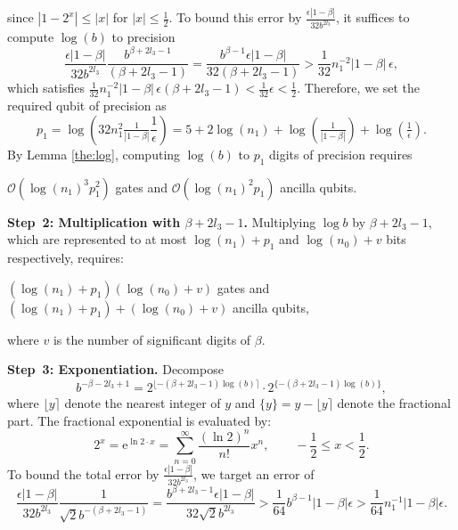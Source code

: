\documentclass[aps,pra,twocolumn,superscriptaddress,preprintnumbers,amsmath,amssymb]{revtex4-2}
\begin{document}
since \( |1 - 2^x| \leq |x| \) for \( |x| \leq\frac{1}{2}\). To bound this error by $\frac{\epsilon|1-\beta|}{32b^{2l_3}}$,
it suffices to compute $\log(b)$ to precision
\begin{equation}
\frac{\epsilon|1-\beta|}{32b^{2l_3}}\frac{b^{\beta+2l_3-1}}{(\beta+2l_3-1)}
=\frac{b^{\beta-1} \epsilon |1-\beta|}{32(\beta+2l_3-1)}>\frac{1}{32}n_1^{-2}|1-\beta|\,\epsilon,
\end{equation}
which satisfies $\frac{1}{32}n_1^{-2}|1-\beta|\,\epsilon(\beta+2l_3-1)<\frac{1}{32}\epsilon<\frac{1}{2}$. Therefore, we set the required qubit of precision as
\begin{equation}
    p_1=\log(32n_1^{2}\tfrac{1}{|1-\beta|}\frac{1}{\epsilon})=5+2\log(n_1)+\log(\tfrac{1}{|1-\beta|})+\log(\tfrac{1}{\epsilon}).
\end{equation}
By Lemma \ref{the:log}, computing $\log(b)$  to $p_1$ digits of precision requires
\begin{center}
    $\mathcal{O}(\log(n_1)^3p_1^2)$ gates and $\mathcal{O}(\log(n_1)^2p_1)$ ancilla qubits.
\end{center}\par
\textbf{Step~2: Multiplication with \boldmath$\beta+2l_3-1$.} 
Multiplying \( \log b \) by \( \beta + 2 l_3 - 1 \), which are represented to at most \( \log (n_1) + p_1 \) and \( \log (n_0) + v \) bits respectively, requires:
 \begin{center}
 $(\log(n_1)+p_1)(\log(n_0)+v)$ gates and $(\log(n_1)+p_1)+(\log(n_0)+v)$ ancilla qubits,
 \end{center}
 where $v$ is the number of significant digits of $\beta$.\par
 \textbf{Step~3: Exponentiation.} 
Decompose
\begin{equation}
    b^{-\beta-2l_3+1}=2^{\lfloor -(\beta+2l_3-1)\log(b)\rceil}\cdot2^{\{-(\beta+2l_3-1)\log(b)\}},
\end{equation}
where $\lfloor y \rceil$ denote the nearest integer of $y$ and $\{y\}= y - \lfloor y \rceil$  denote the fractional part. The fractional exponential is evaluated by:
\begin{equation}
    2^x=\mathrm{e}^{\ln2\cdot x}=\sum_{n=0}^{\infty}\frac{(\ln2)^n}{n!}x^n,\qquad-\frac{1}{2}\leq x<\frac{1}{2}.
\end{equation}
To bound the total error by $\frac{\epsilon|1-\beta|}{32b^{2l_3}}$, 
we target an error of
\begin{equation}
\frac{\epsilon|1-\beta|}{32b^{2l_3}}\frac{1}{\sqrt{2}b^{-(\beta+2l_3-1)}}=\frac{b^{\beta+2l_3-1}\epsilon|1-\beta|}{32\sqrt{2}b^{2l_3}}
>\frac{1}{64}b^{\beta-1}|1-\beta|\epsilon
>\frac{1}{64}n_1^{-1}|1-\beta|\epsilon.
\end{equation}
\end{document}
